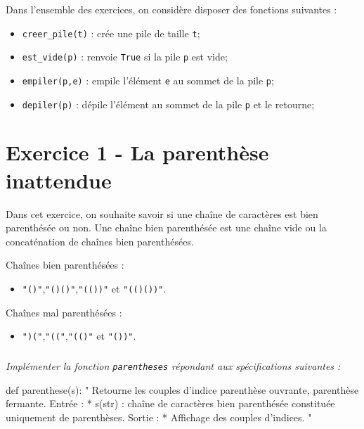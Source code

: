 \documentclass[10pt,fleqn]{article} %
\begin{document}

\vspace{8cm}
\pagestyle{fancy}
\thispagestyle{plain}


\def\columnseprulecolor{\color{ocre}}
\setlength{\columnseprule}{0.4pt} 
\begin{multicols}{2}
Dans l'ensemble des exercices, on considère disposer des fonctions suivantes :
\begin{itemize}
\item \texttt{creer\_pile(t)} : crée une pile de taille \texttt{t};
\item \texttt{est\_vide(p)} : renvoie \texttt{True} si la pile \texttt{p} est vide;
\item \texttt{empiler(p,e)} : empile l'élément \texttt{e} au sommet de la pile \texttt{p};
\item \texttt{depiler(p)} : dépile l'élément au sommet de la pile \texttt{p} et le retourne;
\end{itemize}
\section*{Exercice 1 - La parenthèse inattendue}
Dans cet exercice, on souhaite savoir si une chaîne de caractères est bien parenthésée ou non. 
Une chaîne bien parenthésée est une chaîne vide ou la concaténation de chaînes bien parenthésées. 
\begin{exemple}
Chaînes bien parenthésées :
\begin{itemize}
\item \texttt{"()"},\texttt{"()()"},\texttt{"(())"} et \texttt{"(()())"}.
\end{itemize}
Chaînes mal parenthésées :
\begin{itemize}
\item \texttt{")("},\texttt{"(("},\texttt{"(()"} et \texttt{"())"}.
\end{itemize}
\end{exemple} 

\subparagraph{}\textit{Implémenter la fonction \texttt{parentheses} répondant aux spécifications suivantes : }

\begin{py}
\begin{python}
def parenthese(s):
    "
    Retourne les couples d'indice parenthèse 
    ouvrante, parenthèse fermante.
    Entrée :
     * s(str) : chaîne de caractères bien 
     parenthésée constituée uniquement 
     de parenthèses.
    Sortie : 
     * Affichage des couples d'indices.
    "
\end{python}
\end{py}


\end{multicols}
\end{document}
